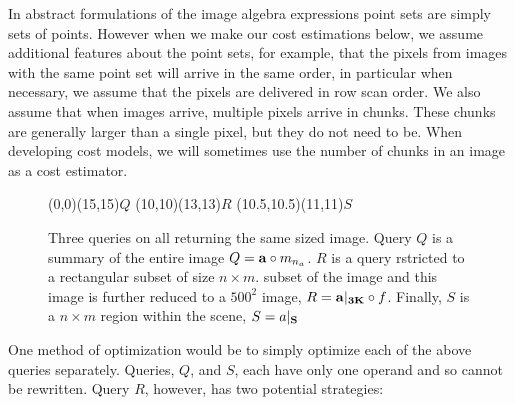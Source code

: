 \documentclass{vldb}
\begin{document}

In abstract formulations of the image algebra expressions point sets
are simply sets of points.  However when we make our cost estimations
below, we assume additional features about the point sets, for example,
that the pixels from images with the same point set will arrive in the
same order, in particular when necessary, we assume that the pixels
are delivered in row scan order.  We also assume that when images
arrive, multiple pixels arrive in chunks.  These chunks are generally
larger than a single pixel, but they do not need to be.  When
developing cost models, we will sometimes use the number of chunks in
an image as a cost estimator.

\begin{figure}[htbp]
   \centering
     \begin{FramePic}[15,15]
    \roi[style=query](0,0)(15,15){$Q$}
    \roi[style=query](10,10)(13,13){$R$}
    \roi[style=query](10.5,10.5)(11,11){$S$}
  \end{FramePic}
  \caption{%
    Three queries on  all returning the same sized image.  Query
    $Q$ is a summary of the entire image $Q={\bf{a}} \circ m_{n_a}$. $R$
    is a query rstricted to a rectangular subset of size $n \times m$.
    subset of the image and this image is further reduced to a $500^2$
    image, $R={\bf{a}}|_{{\bf{3K}}} \circ f$.  Finally, $S$ is a $n \times
    m$ region within the scene, $S=a|_{{\bf{S}}}$}
\end{figure}

One method of optimization would be to simply optimize each of the
above queries separately.  Queries, $Q$, and $S$, each have only one
operand and so cannot be rewritten.  Query $R$, however, has two
potential strategies:

\mbox{    \tree}
\quad
\mbox{   \tree}
\end{document}

